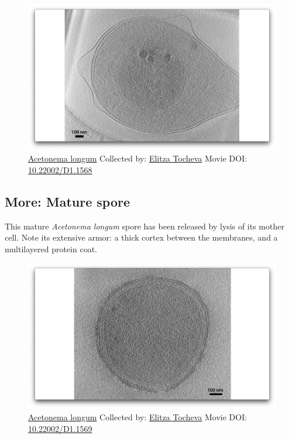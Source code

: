 \documentclass[]{tufte-book}
\begin{document}
\begin{figure}
\includegraphics{movie_stills/8_10a} \caption[\protect\hyperlink{tree}{Acetonema longum} Collected by:
\protect\hyperlink{elitza_tocheva}{Elitza Tocheva} Movie DOI:
\href{https://doi.org/10.22002/D1.1568}{10.22002/D1.1568}]{\protect\hyperlink{tree}{Acetonema longum} Collected by:
\protect\hyperlink{elitza_tocheva}{Elitza Tocheva} Movie DOI:
\href{https://doi.org/10.22002/D1.1568}{10.22002/D1.1568}}\label{fig:8-10a}
\end{figure}

\hypertarget{Mature_spore}{\subsection*{More: Mature
spore}\label{Mature_spore}}

This mature \emph{Acetonema longum} spore has been released by lysis of
its mother cell. Note its extensive armor: a thick cortex between the
membranes, and a multilayered protein coat.





\begin{figure}
\includegraphics{movie_stills/8_10b} \caption[\protect\hyperlink{tree}{Acetonema longum} Collected by:
\protect\hyperlink{elitza_tocheva}{Elitza Tocheva} Movie DOI:
\href{https://doi.org/10.22002/D1.1569}{10.22002/D1.1569}]{\protect\hyperlink{tree}{Acetonema longum} Collected by:
\protect\hyperlink{elitza_tocheva}{Elitza Tocheva} Movie DOI:
\href{https://doi.org/10.22002/D1.1569}{10.22002/D1.1569}}\label{fig:8-10b}
\end{figure}
\end{document}

